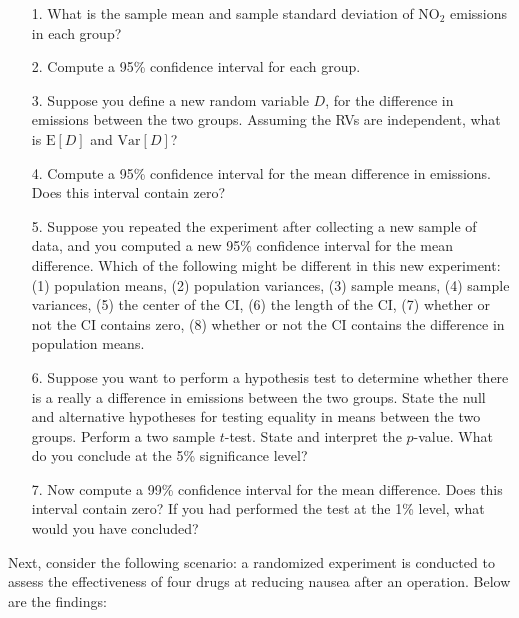 \documentclass[10pt]{extarticle}
\newcommand{\E}{\text{E}}
\newcommand{\Var}{\text{Var}}
\begin{document}
\begin{itemize}

	\item[1.] What is the sample mean and sample standard deviation of NO$_2$ emissions in each group? \\ 

	\item[2.] Compute a 95\% confidence interval for each group.  \\ 

	\item[3.] Suppose you define a new random variable $D$, for the difference in emissions between the two groups. Assuming the RVs are independent, what is $\E[D]$ and $\Var[D]$? \\ 

	\item[4.] Compute a 95\% confidence interval for the mean difference in emissions. Does this interval contain zero? \\ 

	\item[5.] Suppose you repeated the experiment after collecting a new sample of data, and you computed a new 95\% confidence interval for the mean difference. Which of the following might be different in this new experiment: (1) population means, (2) population variances, (3) sample means, (4) sample variances, (5) the center of the CI, (6) the length of the CI, (7) whether or not the CI contains zero, (8) whether or not the CI contains the difference in population means. \\

	\item[6.] Suppose you want to perform a hypothesis test to determine whether there is a really a difference in emissions between the two groups. State the null and alternative hypotheses for testing equality in means between the two groups. Perform a two sample $t$-test. State and interpret the $p$-value. What do you conclude at the 5\% significance level? \\ 

	\item[7.] Now compute a 99\% confidence interval for the mean difference. Does this interval contain zero? If you had performed the test at the 1\% level, what would you have concluded?  

\end{itemize}

\newpage

Next, consider the following scenario: a randomized experiment is conducted to assess the effectiveness of four drugs at reducing nausea after an operation. Below are the findings: \\  
\end{document}
